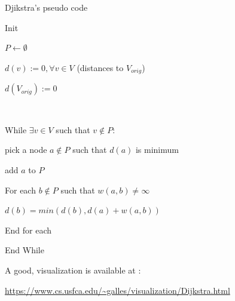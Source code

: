 \begin{frame}{Djikstra's pseudo code}

Init 

$P \leftarrow \emptyset $

$d(v) := 0 , \forall v \in V$ (distances to $V_{orig}$)


$d(V_{orig}) :=0$

~

While $\exists v \in V$ such that $v\notin P$:

\hspace{1cm} pick a node $a \notin P$ such that $d(a)$ is minimum

\hspace{1cm} add $a$ to $P$

\hspace{1cm} For each $ b \notin P$ such that $w(a,b) \neq \infty $

\hspace{2cm} $d(b)=min(d(b),d(a)+w(a,b))$

\hspace{1cm} End for each

End While

\end{frame}


\begin{frame}


A good,  visualization is available at :
 
\small
 \url{https://www.cs.usfca.edu/~galles/visualization/Dijkstra.html}
\end{frame}



